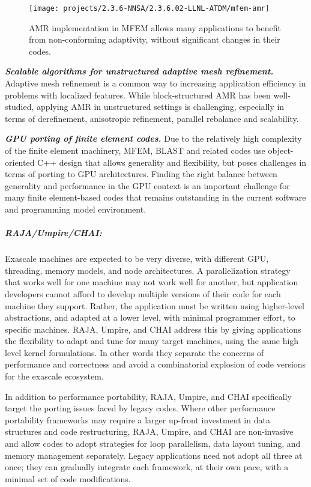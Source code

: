 \begin{figure}[htb]
\centering
\texttt{[image: projects/2.3.6-NNSA/2.3.6.02-LLNL-ATDM/mfem-amr]}
\caption{\label{fig:mfem-amr}AMR implementation in MFEM allows many applications to benefit from non-conforming adaptivity, without significant changes in their codes.}
\end{figure}

\noindent
{\bf \em Scalable algorithms for unstructured adaptive mesh refinement.}
Adaptive mesh refinement is a common way to increasing application efficiency
in problems with localized features. While block-structured AMR has been
well-studied, applying AMR in unstructured settings is challenging, especially
in terms of derefinement, anisotropic refinement, parallel rebalance and
scalability.

\noindent
{\bf \em GPU porting of finite element codes.}
Due to the relatively high complexity of the finite element machinery, MFEM,
BLAST and related codes use object-oriented C++ design that allows generality
and flexibility, but poses challenges in terms of porting to GPU architectures.
Finding the right balance between generality and performance in the GPU context
is an important challenge for many finite element-based codes that remains
outstanding in the current software and programming model environment.

\subparagraph{RAJA/Umpire/CHAI:}
Exascale machines are expected to be very diverse, with different GPU,
threading, memory models, and node architectures.  A parallelization
strategy that works well for one machine may not work well for another,
but application developers cannot afford to develop multiple versions of
their code for each machine they support.  Rather, the application must
be written using higher-level abstractions, and adapted at a lower level,
with minimal programmer effort, to specific machines.  RAJA, Umpire, and
CHAI address this by giving applications the flexibility to adapt and
tune for many target machines, using the same high level kernel
formulations.  In other words they separate the concerns of performance
and correctness and avoid a combinatorial explosion of code versions for
the exascale ecosystem.

In addition to performance portability, RAJA, Umpire, and CHAI
specifically target the porting issues faced by legacy codes.  Where
other performance portability frameworks may require a larger up-front
investment in data structures and code restructuring, RAJA, Umpire, and
CHAI are non-invasive and allow codes to adopt strategies for loop
parallelism, data layout tuning, and memory management separately.
Legacy applications need not adopt all three at once; they can gradually
integrate each framework, at their own pace, with a minimal set of code
modifications.

